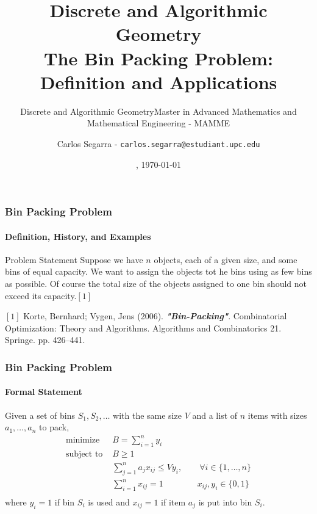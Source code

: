 \documentclass[10pt,    %
    english,            %
    xcolor=table,       %
    envcountsect,        %
    aspectratio=169     %
]{beamer}
\subtitle{Discrete and Algorithmic Geometry} %
\title[The Bin Packing Problem] %
    {\normalsize Discrete and Algorithmic Geometry \\ \Large The Bin Packing Problem: \\ \Large Definition and Applications}
\subtitle{Master in Advanced Mathematics and Mathematical Engineering - MAMME}
\date[\today] %
    {\datedayname, \today}
\author[] %
{Carlos Segarra - \texttt{carlos.segarra@estudiant.upc.edu}}
\begin{document}
\begin{frame}
  \titlepage
\end{frame}

\begin{frame}
    \frametitle{Bin Packing Problem}
    \framesubtitle{Definition, History, and Examples}

    \begin{block}{Problem Statement}
        Suppose we have $n$ objects, each of a given size, and some bins of equal capacity. We want to assign the objects tot he bins using as few bins as possible. Of course the total size of the objects assigned to one bin should not exceed its capacity.$[1]$
    \end{block}

    \tiny
    \begin{description}
        \item $[1]$ Korte, Bernhard; Vygen, Jens (2006). \textbf{\textit{"Bin-Packing"}}. Combinatorial Optimization: Theory and Algorithms. Algorithms and Combinatorics 21. Springe. pp. 426–441.
    \end{description}

\end{frame}

\begin{frame}
    \frametitle{Bin Packing Problem}
    \framesubtitle{Formal Statement}

    \vspace{-10pt}

    Given a set of bins $S_1, S_2, \dots$ with the same size $V$ and a list of $n$ items with sizes $a_1, \dots, a_n$ to pack,
    \begin{equation*}
        \begin{aligned}
            \text{minimize } & B = \sum\limits_{i = 1}^{n} y_i \\
            \text{subject to } & B \geq 1 \\
            & \sum\limits_{j = 1}^{n}a_jx_{ij} \leq V y_i, \quad \quad \forall i \in \lbrace 1, \dots, n\rbrace \\
            & \sum_{i = 1}^n x_{ij} = 1 \qquad \qquad x_{ij}, y_i \in \lbrace 0, 1 \rbrace \\
        \end{aligned}
    \end{equation*}
    \hspace{20pt} where $y_i = 1$ if bin $S_i$ is used and $x_{ij} = 1$ if item $a_j$ is put into bin $S_i$.

\end{frame}
\end{document}
